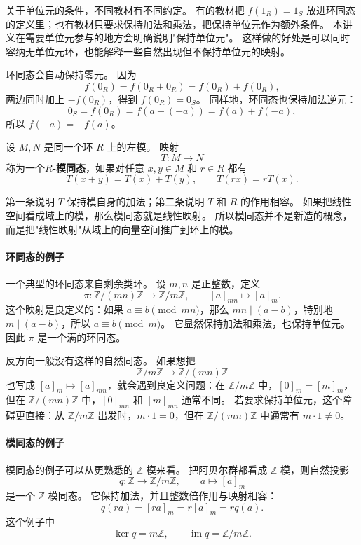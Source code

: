 关于单位元的条件，不同教材有不同约定。
有的教材把 $f(1_R)=1_S$ 放进环同态的定义里；也有教材只要求保持加法和乘法，把保持单位元作为额外条件。
本讲义在需要单位元参与的地方会明确说明"保持单位元"。
这样做的好处是可以同时容纳无单位元环，也能解释一些自然出现但不保持单位元的映射。

环同态会自动保持零元。
因为
\[
f(0_R)=f(0_R+0_R)=f(0_R)+f(0_R),
\]
两边同时加上 $-f(0_R)$，得到 $f(0_R)=0_S$。
同样地，环同态也保持加法逆元：
\[
0_S=f(0_R)=f(a+(-a))=f(a)+f(-a),
\]
所以 $f(-a)=-f(a)$。

\begin{definition}[模同态]\label{def:module-homomorphism}
设 $M,N$ 是同一个环 $R$ 上的左模。
映射
\[
T:M\to N
\]
称为一个\textbf{$R$-模同态}，如果对任意 $x,y\in M$ 和 $r\in R$ 都有
\[
T(x+y)=T(x)+T(y),\qquad T(rx)=rT(x).
\]
\end{definition}

第一条说明 $T$ 保持模自身的加法；第二条说明 $T$ 和 $R$ 的作用相容。
如果把线性空间看成域上的模，那么模同态就是线性映射。
所以模同态并不是新造的概念，而是把"线性映射"从域上的向量空间推广到环上的模。

\paragraph*{环同态的例子}
一个典型的环同态来自剩余类环。
设 $m,n$ 是正整数，定义
\[
\pi:\mathbb Z/(mn)\mathbb Z\to \mathbb Z/m\mathbb Z,\qquad
[a]_{mn}\mapsto [a]_m.
\]
这个映射是良定义的：如果 $a\equiv b\pmod{mn}$，那么 $mn\mid(a-b)$，特别地 $m\mid(a-b)$，所以 $a\equiv b\pmod m$。
它显然保持加法和乘法，也保持单位元。
因此 $\pi$ 是一个满的环同态。

反方向一般没有这样的自然同态。
如果想把
\[
\mathbb Z/m\mathbb Z\to \mathbb Z/(mn)\mathbb Z
\]
也写成 $[a]_m\mapsto[a]_{mn}$，就会遇到良定义问题：在 $\mathbb Z/m\mathbb Z$ 中，$[0]_m=[m]_m$，但在 $\mathbb Z/(mn)\mathbb Z$ 中，$[0]_{mn}$ 和 $[m]_{mn}$ 通常不同。
若要求保持单位元，这个障碍更直接：从 $\mathbb Z/m\mathbb Z$ 出发时，$m\cdot 1=0$，但在 $\mathbb Z/(mn)\mathbb Z$ 中通常有 $m\cdot1\neq0$。

\paragraph*{模同态的例子}
模同态的例子可以从更熟悉的 $\mathbb Z$-模来看。
把阿贝尔群都看成 $\mathbb Z$-模，则自然投影
\[
q:\mathbb Z\to \mathbb Z/m\mathbb Z,\qquad a\mapsto [a]_m
\]
是一个 $\mathbb Z$-模同态。
它保持加法，并且整数倍作用与映射相容：
\[
q(ra)=[ra]_m=r[a]_m=rq(a).
\]
这个例子中
\[
\ker q=m\mathbb Z,\qquad \operatorname{im}q=\mathbb Z/m\mathbb Z.
\]

